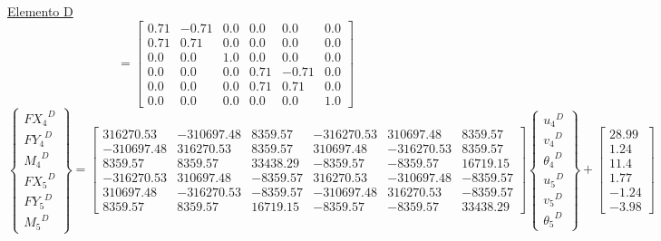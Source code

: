 \documentclass[a4paper]{article}
\begin{document}
\underline{Elemento D}
\\
{
\renewcommand{\arraystretch}{1.7}
\begin{equation}
[T^*_D]=
\left[\begin{matrix}0.71 & -0.71 & 0.0 & 0.0 & 0.0 & 0.0\\0.71 & 0.71 & 0.0 & 0.0 & 0.0 & 0.0\\0.0 & 0.0 & 1.0 & 0.0 & 0.0 & 0.0\\0.0 & 0.0 & 0.0 & 0.71 & -0.71 & 0.0\\0.0 & 0.0 & 0.0 & 0.71 & 0.71 & 0.0\\0.0 & 0.0 & 0.0 & 0.0 & 0.0 & 1.0\end{matrix}\right]
\end{equation}\begin{equation}
\left\{ \begin{array}{c}
{FX_4}^D \\ {FY_4}^D \\ {M_4}^D \\
{FX_5}^D  \\ {FY_5}^D \\ {M_5}^D 
\end{array} \right\} = 
\left[\begin{matrix}316270.53 & -310697.48 & 8359.57 & -316270.53 & 310697.48 & 8359.57\\-310697.48 & 316270.53 & 8359.57 & 310697.48 & -316270.53 & 8359.57\\8359.57 & 8359.57 & 33438.29 & -8359.57 & -8359.57 & 16719.15\\-316270.53 & 310697.48 & -8359.57 & 316270.53 & -310697.48 & -8359.57\\310697.48 & -316270.53 & -8359.57 & -310697.48 & 316270.53 & -8359.57\\8359.57 & 8359.57 & 16719.15 & -8359.57 & -8359.57 & 33438.29\end{matrix}\right]
\left\{ \begin{array}{c}
{u_4}^D \\ {v_4}^D \\ {{\theta}_4}^D \\
{u_5}^D  \\ {v_5}^D \\ {{\theta}_5}^D 
\end{array} \right\}+
\begin{bmatrix}28.99\\1.24\\11.4\\1.77\\-1.24\\-3.98\end{bmatrix}
\end{equation}
}
\end{document}
